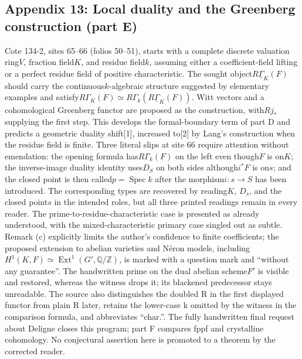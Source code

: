 \documentclass[10pt,oneside]{book}
\begin{document}
\subsection*{Appendix 13: Local duality and the Greenberg construction (part E)}
Cote 134-2, sites 65--66 (folios 50--51), starts with a complete discrete valuation ring$V$, fraction field$K$, and residue field$k$, assuming either a coefficient-field lifting or a perfect residue field of positive characteristic. The sought object$R\underline\Gamma_K(F)$ should carry the continuous$k$-algebraic structure suggested by elementary examples and satisfy$R\Gamma_K(F)\simeq R\Gamma_k(R\underline\Gamma_K(F))$. Witt vectors and a cohomological Greenberg functor are proposed as the construction, with$Rj_*$ supplying the first step. This develops the formal-boundary term of part D and predicts a geometric duality shift[1], increased to[2] by Lang's construction when the residue field is finite. Three literal slips at site 66 require attention without emendation: the opening formula has$R\Gamma_k(F)$ on the left even though$F$ is on$K$; the inverse-image duality identity uses$D_S$ on both sides although$i^*F$ is on$s$; and the closed point is then called$p=\operatorname{Spec}k$ after the morphism$i:s\to S$ has been introduced. The corresponding types are recovered by reading$K$, $D_s$, and the closed point$s$ in the intended roles, but all three printed readings remain in every reader. The prime-to-residue-characteristic case is presented as already understood, with the mixed-characteristic primary case singled out as subtle. Remark (c) explicitly limits the author's confidence to finite coefficients; the proposed extension to abelian varieties and Néron models, including$H^1(K,F)\simeq\operatorname{Ext}^1(G',\mathbb Q/\mathbb Z)$, is marked with a question mark and ``without any guarantee''. The handwritten prime on the dual abelian scheme$F'$ is visible and restored, whereas the witness drops it; its blackened predecessor stays unreadable. The source also distinguishes the doubled R in the first displayed functor from plain R later, retains the lower-case k omitted by the witness in the comparison formula, and abbreviates ``char.''. The fully handwritten final request about Deligne closes this program; part F compares fppf and crystalline cohomology. No conjectural assertion here is promoted to a theorem by the corrected reader.
\end{document}
